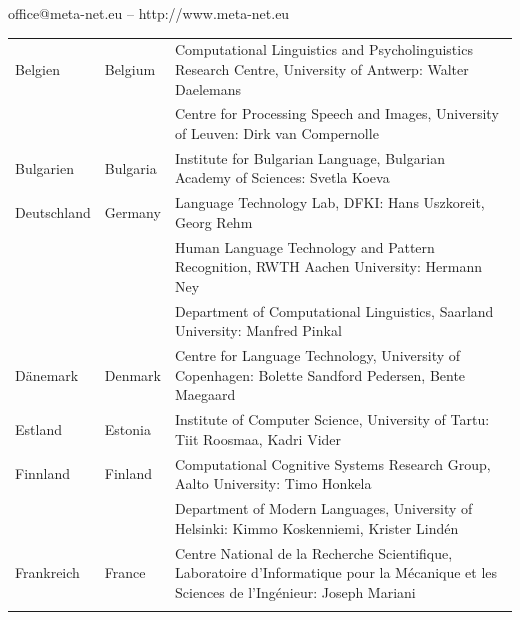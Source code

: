 \vfill
\centerline{office@meta-net.eu -- http://www.meta-net.eu}

\cleardoublepage

\appendix
{}

%

  
\cleardoublepage

\label{metanetmembers}

\small

\begin{longtable}{@{}llp{113mm}@{}}
  Belgien & \textcolor{grey1}{Belgium} & Computational Linguistics and Psycholinguistics Research Centre, University of Antwerp: Walter Daelemans\\ \addlinespace
  & & Centre for Processing Speech and Images, University of Leuven: Dirk van Compernolle \\ \addlinespace
  Bulgarien & \textcolor{grey1}{Bulgaria} & Institute for Bulgarian Language, Bulgarian Academy of Sciences: Svetla Koeva \\ \addlinespace
  Deutschland & \textcolor{grey1}{Germany} & Language Technology Lab, DFKI: Hans Uszkoreit, Georg Rehm\\ \addlinespace
  & & Human Language Technology and Pattern Recognition, RWTH Aachen University: Hermann Ney \\ \addlinespace
  & & Department of Computational Linguistics, Saarland University: Manfred Pinkal\\ \addlinespace Dänemark &  \textcolor{grey1}{Denmark} & Centre for Language Technology, University of Copenhagen: \newline Bolette Sandford Pedersen, Bente Maegaard\\ \addlinespace
  Estland & \textcolor{grey1}{Estonia} & Institute of Computer Science, University of Tartu: Tiit Roosmaa, Kadri Vider\\ \addlinespace
  Finnland & \textcolor{grey1}{Finland} & Computational Cognitive Systems Research Group, Aalto University: Timo Honkela\\ \addlinespace
  & & Department of Modern Languages, University of Helsinki: Kimmo Koskenniemi, Krister Lindén \\ \addlinespace
  Frankreich & \textcolor{grey1}{France} & Centre National de la Recherche Scientifique, Laboratoire d'Informatique pour la Mécanique et les Sciences de l'Ingénieur: Joseph Mariani \\ \addlinespace

\end{longtable}
